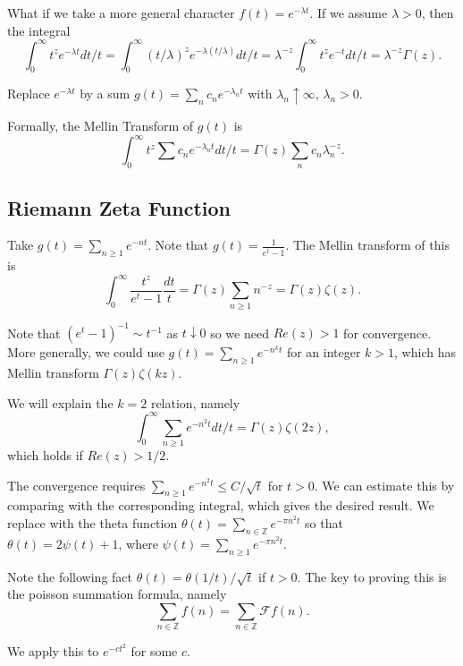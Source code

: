 \documentclass[12pt]{scrartcl}
\newcommand{\Z}{\mathbb{Z}}
\let \mc \mathcal
\begin{document}
What if we take a more general character $f(t) = e^{-\lambda t}$.  If we assume $\lambda > 0$, then the integral
$$\int_0^\infty t^z e^{-\lambda t} dt/t = \int_0^\infty (t/\lambda)^z e^{-\lambda(t/\lambda)}dt/t = \lambda^{-z} \int_0^\infty t^z e^{-t}dt/t = \lambda^{-z} \Gamma(z).$$ 

Replace $e^{-\lambda t}$ by a sum $g(t) = \sum_n c_n e^{-\lambda_n t}$ with $\lambda_n \uparrow \infty$, $\lambda_n > 0$.

Formally, the Mellin Transform of $g(t)$ is 
$$\int_0^\infty t^z \sum c_n e^{-\lambda_n t} dt/t = \Gamma(z) \sum_n c_n \lambda_n^{-z}.$$

\subsection{Riemann Zeta Function}
Take $g(t) = \sum_{n \ge 1} e^{-nt}$.  Note that $g(t) = \frac{1}{e^t - 1}$.  The Mellin transform of this is 
$$\int_0^\infty \frac{t^z}{e^t - 1} \frac{dt}{t} = \Gamma(z) \sum_{n \ge 1} n^{-z}= \Gamma(z) \zeta(z).$$

Note that $(e^t - 1)^{-1} \sim t^{-1}$ as $t \downarrow 0$ so we need $Re(z) > 1$ for convergence.  More generally, we could use $g(t) = \sum_{n \ge 1} e^{-n^k t}$ for an integer $k > 1$, which has Mellin transform $\Gamma(z) \zeta(kz)$.

We will explain the $k = 2$ relation, namely
$$\int_0^\infty \sum_{n \ge 1} e^{-n^2 t} dt/t = \Gamma(z) \zeta(2z),$$
which holds if $Re(z) > 1/2$.

The convergence requires $\sum_{n \ge 1} e^{-n^2 t} \le C/\sqrt{t}$ for $t > 0$.  We can estimate this by comparing with the corresponding integral, which gives the desired result.  We replace with the theta function $\theta(t) = \sum_{n \in \Z} e^{-\pi n^2 t}$ so that $\theta(t) = 2\psi(t) + 1$, where $\psi(t) = \sum_{n \ge 1} e^{-\pi n^2 t}$.

Note the following fact $\theta(t) = \theta(1/t)/\sqrt{t} $ if $t > 0$.  The key to proving this is the poisson summation formula, namely
$$\sum_{n \in \Z} f(n) = \sum_{n \in \Z} \mc F f(n).$$

We apply this to $e^{-ct^2}$ for some $c$.  
\end{document}
